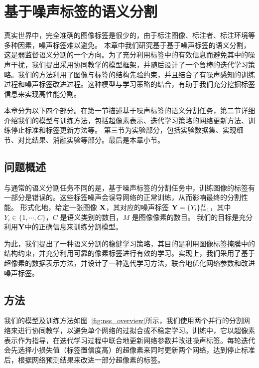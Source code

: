 \chapter{基于噪声标签的语义分割}

真实世界中，完全准确的图像标签是很少的，由于标注图像、标注者、标注环境等多种因素，噪声标签难以避免。
本章中我们研究基于基于噪声标签的语义分割，这是弱监督语义分割的一个方向。为了充分利用标签中的有效信息而避免其中的噪声干扰，我们提出采用协同教学的模型框架，并随后设计了一个鲁棒的迭代学习策略。我们的方法利用了图像与标签的结构先验约束，并且结合了有噪声感知的训练过程和噪声标签改进过程。这种模型与学习策略的结合，有助于我们充分挖掘标签信息来实现高性能分割。

本章分为以下四个部分。在第一节描述基于噪声标签的语义分割任务，第二节详细介绍我们的模型与训练方法，包括超像素表示、迭代学习策略的网络更新方法、训练停止标准和标签更新方法等。
第三节为实验部分，包括实验数据集、实现细节、对比结果、消融实验等部分。最后是本章小节。

\section{问题概述}
与通常的语义分割任务不同的是，基于噪声标签的分割任务中，训练图像的标签有一部分是错误的。这些标签噪声会误导网络的正常训练，从而影响最终的分割性能。
形式化地，给定一张图像 $\mathbf{X}$，其对应的噪声标签 $\mathbf{Y}=\{Y_i\}_{i=1}^M$，其中 $Y_i\in\{1,\cdots, C\}$，$C$ 是语义类别的数目，$M$ 是图像像素的数目。
我们的目标是充分利用$\mathbf{Y}$中的正确信息来训练分割模型。

为此，我们提出了一种语义分割的稳健学习策略，其目的是利用图像标签掩膜中的结构约束，并充分利用可靠的像素标签进行有效的学习。实现上，我们采用了基于超像素的数据表示方法，并设计了一种迭代学习方法，联合地优化网络参数和改进噪声标签。

\section{方法}
我们的模型及训练方法如图~\ref{fig:nss_overview}所示，我们使用两个并行的分割网络来进行协同教学，以避免单个网络的过拟合或不稳定学习。训练中，它以超像素表示作为指导，在迭代学习过程中联合地更新网络参数并改进噪声标签。每轮迭代会先选择小损失值（标签置信度高）的超像素来同时更新两个网络，达到停止标准后，根据网络预测结果来改进一部分超像素的标签。

